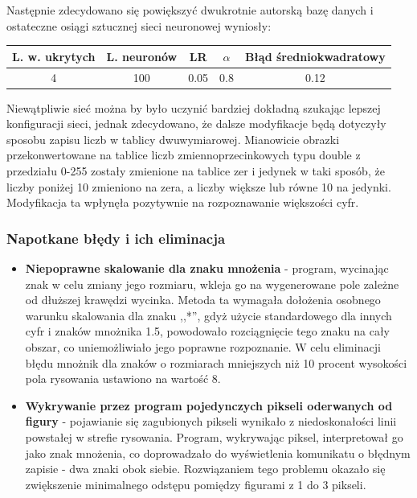 \documentclass[12pt,a4paper]{article}
\begin{document}
Następnie zdecydowano się powiększyć dwukrotnie autorską bazę danych i ostateczne osiągi sztucznej sieci neuronowej wyniosły:

\begin{center}
 \begin{tabular}{||c c c c c||} 
 \hline
 L. w. ukrytych & L. neuronów & LR & $\alpha$ & Błąd średniokwadratowy \\
 \hline\hline
 4 & 100 & 0.05 & 0.8 & 0.12 \\ 
 \hline
\end{tabular}
\end{center}

Niewątpliwie sieć można by było uczynić bardziej dokładną szukając lepszej konfiguracji sieci, jednak zdecydowano, że dalsze modyfikacje będą dotyczyły sposobu zapisu liczb w tablicy dwuwymiarowej. Mianowicie obrazki przekonwertowane na tablice liczb zmiennoprzecinkowych typu double z przedziału 0-255 zostały zmienione na tablice zer i jedynek w taki sposób, że liczby poniżej 10 zmieniono na zera, a liczby większe lub równe 10 na jedynki. Modyfikacja ta wpłynęła pozytywnie na rozpoznawanie większości cyfr.
    \subsubsection*{Napotkane błędy i ich eliminacja}
    \begin{itemize}
        \item \textbf{Niepoprawne skalowanie dla znaku mnożenia} - program, wycinając znak w celu zmiany jego rozmiaru, wkleja go na wygenerowane pole zależne od dłuższej krawędzi wycinka. Metoda ta wymagała dołożenia osobnego warunku skalowania dla znaku ,,*'', gdyż użycie standardowego dla innych cyfr i znaków mnożnika 1.5, powodowało rozciągnięcie tego znaku na cały obszar, co uniemożliwiało jego poprawne rozpoznanie. W celu eliminacji błędu mnożnik dla znaków o rozmiarach mniejszych niż 10 procent wysokości pola rysowania ustawiono na wartość 8.
        \item \textbf{Wykrywanie przez program pojedynczych pikseli oderwanych od figury} - pojawianie się zagubionych pikseli wynikało z niedoskonałości linii powstałej w strefie rysowania. Program, wykrywając piksel, interpretował go jako znak mnożenia, co doprowadzało do wyświetlenia komunikatu o błędnym zapisie - dwa znaki obok siebie. Rozwiązaniem tego problemu okazało się zwiększenie minimalnego odstępu pomiędzy figurami z 1 do 3 pikseli.
    \end{itemize}
\end{document}

